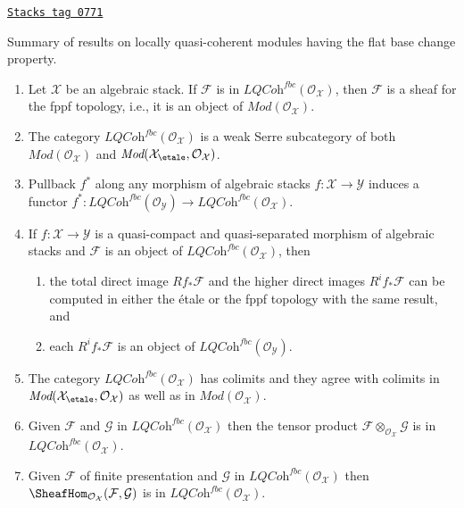 \begin{proposition}
\label{stacks-cohomology-proposition-loc-qcoh-flat-base-change}
\href{https://stacks.math.columbia.edu/tag/0771}{\texttt{Stacks tag 0771}}

Summary of results on locally quasi-coherent modules having the flat
base change property.
\begin{enumerate}
\item Let $\mathcal{X}$ be an algebraic stack.
If $\mathcal{F}$ is in $\textit{LQCoh}^{fbc}(\mathcal{O}_\mathcal{X})$,
then $\mathcal{F}$ is a sheaf for the fppf topology, i.e., it is
an object of $\textit{Mod}(\mathcal{O}_\mathcal{X})$.
\item The category $\textit{LQCoh}^{fbc}(\mathcal{O}_\mathcal{X})$
is a weak Serre subcategory of both $\textit{Mod}(\mathcal{O}_\mathcal{X})$
and $\textit{Mod}(\mathcal{X}_\etale, \mathcal{O}_\mathcal{X})$.
\item Pullback $f^*$ along any morphism of algebraic stacks
$f : \mathcal{X} \to \mathcal{Y}$ induces a functor
$f^* : \textit{LQCoh}^{fbc}(\mathcal{O}_\mathcal{Y}) \to
\textit{LQCoh}^{fbc}(\mathcal{O}_\mathcal{X})$.
\item If $f : \mathcal{X} \to \mathcal{Y}$ is a
quasi-compact and quasi-separated morphism of algebraic stacks
and $\mathcal{F}$ is an object of
$\textit{LQCoh}^{fbc}(\mathcal{O}_\mathcal{X})$, then
\begin{enumerate}
\item the total direct image $Rf_*\mathcal{F}$ and the higher direct
images $R^if_*\mathcal{F}$ can be computed in either the \'etale or the
fppf topology with the same result, and
\item each $R^if_*\mathcal{F}$ is an object of
$\textit{LQCoh}^{fbc}(\mathcal{O}_\mathcal{Y})$.
\end{enumerate}
\item The category $\textit{LQCoh}^{fbc}(\mathcal{O}_\mathcal{X})$ has
colimits and they agree with colimits in
$\textit{Mod}(\mathcal{X}_\etale, \mathcal{O}_\mathcal{X})$
as well as in $\textit{Mod}(\mathcal{O}_\mathcal{X})$.
\item Given $\mathcal{F}$ and $\mathcal{G}$ in
$\textit{LQCoh}^{fbc}(\mathcal{O}_\mathcal{X})$ then the tensor product
$\mathcal{F} \otimes_{\mathcal{O}_\mathcal{X}} \mathcal{G}$
is in $\textit{LQCoh}^{fbc}(\mathcal{O}_\mathcal{X})$.
\item Given $\mathcal{F}$ of finite presentation and $\mathcal{G}$ in
$\textit{LQCoh}^{fbc}(\mathcal{O}_\mathcal{X})$ then
$\SheafHom_{\mathcal{O}_\mathcal{X}}(\mathcal{F}, \mathcal{G})$
is in $\textit{LQCoh}^{fbc}(\mathcal{O}_\mathcal{X})$.
\end{enumerate}
\end{proposition}

